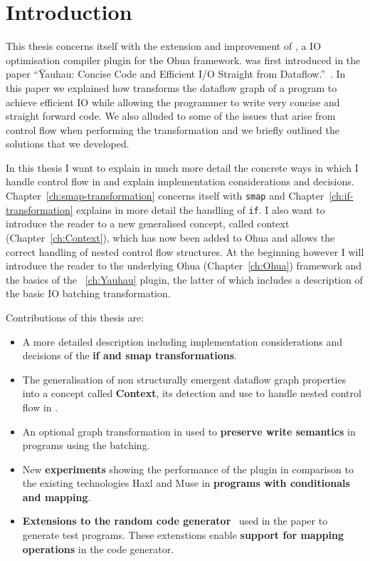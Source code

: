 \chapter{Introduction}

\label{ch:Intro}

This thesis concerns itself with the extension and improvement of \yauhau{}, a IO optimisation compiler plugin for the Ohua framework.
\yauhau{} was first introduced in the paper ``Ÿauhau: Concise Code and Efficient I/O Straight from Dataflow.''~\cite{ErtelGoensAdamEtAl2016}.
In this paper we explained how \yauhau{} transforms the dataflow graph of a program to achieve efficient IO while allowing the programmer to write very concise and straight forward code.
We also alluded to some of the issues that arise from control flow when performing the \yauhau{} transformation and we briefly outlined the solutions that we developed.

In this thesis I want to explain in much more detail the concrete ways in which I handle control flow in \yauhau{} and explain implementation considerations and decisions.
Chapter~\ref{ch:smap-transformation} concerns itself with \texttt{smap} and Chapter~\ref{ch:if-transformation} explains in more detail the handling of \texttt{if}.
I also want to introduce the reader to a new generalised concept, called context (Chapter~\ref{ch:Context}), which has now been added to Ohua and allows the correct handling of nested control flow structures.
At the beginning however I will introduce the reader to the underlying Ohua (Chapter~\ref{ch:Ohua}) framework and the basics of the \yauhau{}~\ref{ch:Yauhau} plugin, the latter of which includes a description of the basic IO batching transformation.

Contributions of this thesis are:
\begin{itemize}
    \item A more detailed description including implementation considerations and decisions of the \textbf{if and smap transformations}.
    \item The generalisation of non structurally emergent dataflow graph properties into a concept called \textbf{Context}, its detection and use to handle nested control flow in \yauhau{}.
    \item An optional graph transformation in \yauhau{} used to \textbf{preserve write semantics} in programs using the \yauhau{} batching.
    \item New \textbf{experiments} showing the performance of the \yauhau{} plugin in comparison to the existing technologies Haxl and Muse in \textbf{programs with conditionals and mapping}.
    \item \textbf{Extensions to the random code generator}~\cite{Goens-rand-code-graph} used in the \yauhau{} paper to generate test programs.
    These extenstions enable \textbf{support for mapping operations} in the code generator.
\end{itemize}

